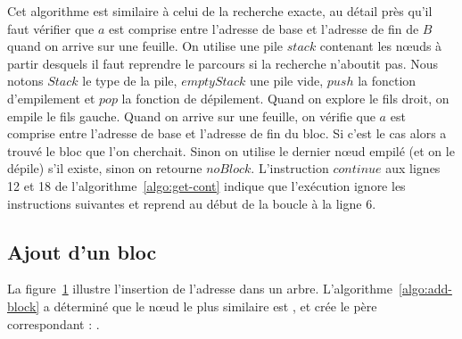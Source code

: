 Cet algorithme est similaire à celui de la recherche exacte, au détail près
qu'il faut vérifier que $a$ est comprise entre l'adresse de base et l'adresse
de fin de $B$ quand on arrive sur une feuille.
On utilise une pile $stack$ contenant les n\oe{}uds à partir desquels il faut
reprendre le parcours si la recherche n'aboutit pas.
Nous notons $Stack$ le type de la pile, $emptyStack$ une pile vide, $push$ la
fonction d'empilement et $pop$ la fonction de dépilement.
Quand on explore le fils droit, on empile le fils gauche.
Quand on arrive sur une feuille, on vérifie que $a$ est comprise entre l'adresse
de base et l'adresse de fin du bloc.
Si c'est le cas alors a trouvé le bloc que l'on cherchait.
Sinon on utilise le dernier n\oe{}ud empilé (et on le dépile) s'il existe,
sinon on retourne $noBlock$.
L'instruction $continue$ aux lignes 12 et 18 de l'algorithme~\ref{algo:get-cont}
indique que l'exécution ignore les instructions suivantes et reprend au début de
la boucle à la ligne 6.


\subsection{Ajout d'un bloc}


La figure~\ref{fig:insertion-Patricia-trie} illustre l'insertion de l'adresse
 dans un arbre.
L'algorithme~\ref{algo:add-block} a déterminé que le n\oe{}ud le plus similaire
est , et crée le père correspondant :
.

\begin{figure}[h]
  
  \label{fig:insertion-Patricia-trie}
\end{figure}

